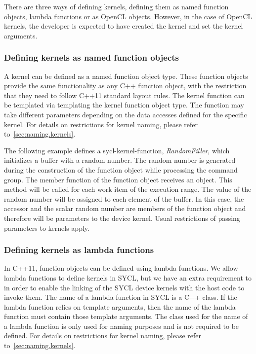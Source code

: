 There are three ways of defining kernels, defining them as named function objects,
lambda functions or as OpenCL  objects. However, in the case of
OpenCL kernels, the developer is expected to have created the kernel and set the
kernel arguments.

\subsubsection{Defining kernels as named function objects}
\label{sec:interfaces.kernels.as.function-objects}

A kernel can be defined as a named function object type. These function objects
provide the same functionality as any C++ function object, with the
restriction that they need to follow C++11 standard layout rules.
The kernel function can be templated via templating the kernel
function object type. The  function may take different
parameters depending on the data accesses defined for the
specific kernel. For details on restrictions for kernel naming,
please refer to~\ref{sec:naming.kernels}.

The following example defines a \gls{sycl-kernel-function}, \textit{RandomFiller},
which initializes a buffer with a random number. 
The random number is generated during the construction of the function 
object while processing the command group.
The  member function of the function object receives an  object.
This method will be called for each work item of the execution range.
The value of the random number will be assigned to each element of the
buffer.
In this case, the accessor and the scalar random number are members of the
function object and therefore will be parameters to the device kernel.
Usual restrictions of passing parameters to kernels apply.




\subsubsection{Defining kernels as lambda functions}
\label{sec:interfaces.kernels.as.lambdas}

In C++11, function objects can be defined using lambda functions. We allow lambda
functions to define kernels in SYCL, but we have an extra requirement to
 in order to enable the linking of the SYCL
device kernels with the host code to invoke them. The name of a lambda function
in SYCL is a C++ class. If the lambda function relies on template arguments,
then the name of the lambda function must contain those template arguments. The
class used for the name of a lambda function is only used for naming purposes
and is not required to be defined. For details on restrictions for kernel
naming, please refer to~\ref{sec:naming.kernels}.

